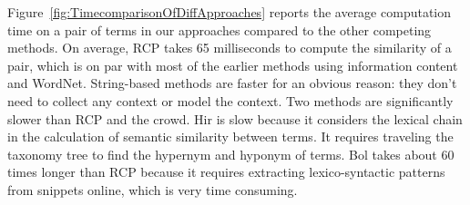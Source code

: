 Figure~\ref{fig:TimecomparisonOfDiffApproaches} reports the average
computation time on a pair of terms in our approaches compared
to the other competing methods. On average, RCP takes 65 milliseconds
to compute the similarity of a pair, which is on par with most of
the earlier methods using information content and WordNet.
String-based methods are faster for an obvious reason:
they don't need to collect any context or model the context.
Two methods are significantly slower than RCP and the crowd.
Hir is slow because it considers the lexical chain in the
calculation of semantic similarity between terms. It requires traveling the
taxonomy tree to find the hypernym and hyponym of terms. %
Bol takes about 60 times longer than RCP because
it requires extracting lexico-syntactic patterns from snippets online,
which is very time consuming.

